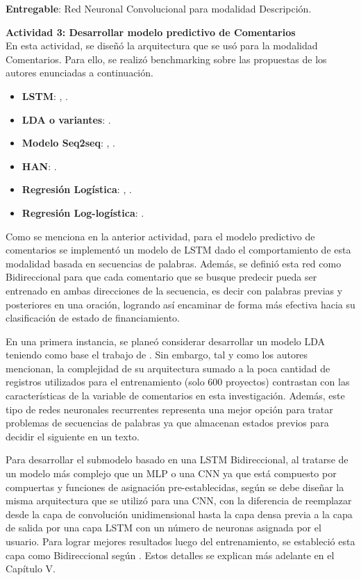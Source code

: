 \textbf{Entregable}: Red Neuronal Convolucional para modalidad Descripción.

\textbf{Actividad 3: Desarrollar modelo predictivo de Comentarios}
\\
En esta actividad, se diseñó la arquitectura que se usó para la modalidad Comentarios. Para ello, se realizó benchmarking sobre las propuestas de los autores enunciadas a continuación.

\begin{itemize}
	\item \textbf{LSTM}: \cite{pr_jin2019dayssuccess}, \cite{pr_shafqat2019topicpredictions}.
	\item \textbf{LDA o variantes}: \cite{pr_shafqat2019topicpredictions}.
	\item \textbf{Modelo Seq2seq}: \cite{pr_lee2018contentDL}, \cite{pr_jin2019dayssuccess}.
	\item \textbf{HAN}: \cite{pr_lee2018contentDL}.
	\item \textbf{Regresión Logística}: \cite{pr_li2016predcrowd}, \cite{pr_kaur2017socmedcrowd}.
	\item \textbf{Regresión Log-logística}: \cite{pr_li2016predcrowd}.
\end{itemize}

Como se menciona en la anterior actividad, para el modelo predictivo de comentarios se implementó un modelo de LSTM dado el comportamiento de esta modalidad basada en secuencias de palabras. Además, se definió esta red como Bidireccional para que cada comentario que se busque predecir pueda ser entrenado en ambas direcciones de la secuencia, es decir con palabras previas y posteriores en una oración, logrando así encaminar de forma más efectiva hacia su clasificación de estado de financiamiento.

En una primera instancia, se planeó considerar desarrollar un modelo LDA teniendo como base el trabajo de \cite{pr_shafqat2019topicpredictions}. Sin embargo, tal y como los autores mencionan, la complejidad de su arquitectura sumado a la poca cantidad de registros utilizados para el entrenamiento (solo 600 proyectos) contrastan con las características de la variable de comentarios en esta investigación. Además, este tipo de redes neuronales recurrentes representa una mejor opción para tratar problemas de secuencias de palabras ya que almacenan estados previos para decidir el siguiente en un texto.

Para desarrollar el submodelo basado en una LSTM Bidireccional, al tratarse de un modelo más complejo que un MLP o una CNN ya que está compuesto por compuertas y funciones de asignación pre-establecidas, según \cite{tec_malik2019pythonnlp} se debe diseñar la misma arquitectura que se utilizó para una CNN, con la diferencia de reemplazar desde la capa de convolución unidimensional hasta la capa densa previa a la capa de salida por una capa LSTM con un número de neuronas asignada por el usuario. Para lograr mejores resultados luego del entrenamiento, se estableció esta capa como Bidireccional según \cite{tec_brownlee2017bidirectional_lstm}. Estos detalles se explican más adelante en el Capítulo V.

